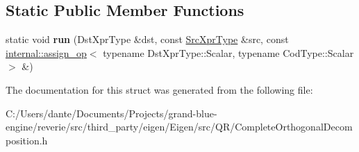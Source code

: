 \subsection*{Static Public Member Functions}
\begin{DoxyCompactItemize}
\item 
\mbox{\label{struct_eigen_1_1internal_1_1_assignment_3_01_dst_xpr_type_00_01_inverse_3_01_complete_orthogonalcd5d352c5ea4dcae855a0a56ba39cbfd_acbb612854432ba8044da1f1368314dfb}} 
static void {\bfseries run} (Dst\+Xpr\+Type \&dst, const \mbox{\hyperlink{class_eigen_1_1_inverse}{Src\+Xpr\+Type}} \&src, const \mbox{\hyperlink{struct_eigen_1_1internal_1_1assign__op}{internal\+::assign\+\_\+op}}$<$ typename Dst\+Xpr\+Type\+::\+Scalar, typename Cod\+Type\+::\+Scalar $>$ \&)
\end{DoxyCompactItemize}


The documentation for this struct was generated from the following file\+:\begin{DoxyCompactItemize}
\item 
C\+:/\+Users/dante/\+Documents/\+Projects/grand-\/blue-\/engine/reverie/src/third\+\_\+party/eigen/\+Eigen/src/\+Q\+R/Complete\+Orthogonal\+Decomposition.\+h\end{DoxyCompactItemize}
